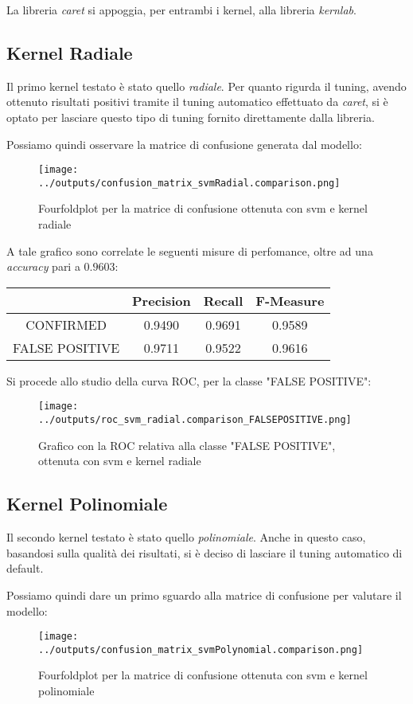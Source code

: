 La libreria \textit{caret} si appoggia, per entrambi i kernel, alla libreria 
\textit{kernlab}.

\subsection{Kernel Radiale}
Il primo kernel testato è stato quello \textit{radiale}.
Per quanto rigurda il tuning, avendo ottenuto risultati positivi tramite il tuning automatico
effettuato da \textit{caret}, si è optato per lasciare questo tipo di tuning fornito 
direttamente dalla libreria.

Possiamo quindi osservare la matrice di confusione generata dal modello:
\begin{figure}[H]
    \centering
    \texttt{[image: ../outputs/confusion\_matrix\_svmRadial.comparison.png]}
    \caption{Fourfoldplot per la matrice di confusione ottenuta con svm e kernel radiale}
\end{figure}
A tale grafico sono correlate le seguenti misure di perfomance, oltre ad una 
\textit{accuracy} pari a $0.9603$:
\begin{center}
    \begin{tabular}{| c | c c c |} 
    \hline
    & Precision & Recall & F-Measure \\ [0.5ex] 
    \hline\hline
    CONFIRMED & 0.9490 & 0.9691 & 0.9589 \\ 
    \hline
    FALSE POSITIVE & 0.9711 & 0.9522 & 0.9616 \\ 
    \hline
    \end{tabular}
\end{center}
Si procede allo studio della curva ROC, per la classe "FALSE POSITIVE":
\begin{figure}[H]
    \centering
    \texttt{[image: ../outputs/roc\_svm\_radial.comparison\_FALSEPOSITIVE.png]}
    \caption{Grafico con la ROC relativa alla classe "FALSE POSITIVE", ottenuta con svm e kernel radiale}
\end{figure}
\subsection{Kernel Polinomiale}
Il secondo kernel testato è stato quello \textit{polinomiale}.
Anche in questo caso, basandosi sulla qualità dei risultati, si è deciso di
lasciare il tuning automatico di default.

Possiamo quindi dare un primo sguardo alla matrice di confusione per valutare il modello:
\begin{figure}[H]
    \centering
    \texttt{[image: ../outputs/confusion\_matrix\_svmPolynomial.comparison.png]}
    \caption{Fourfoldplot per la matrice di confusione ottenuta con svm e kernel polinomiale}
\end{figure}

